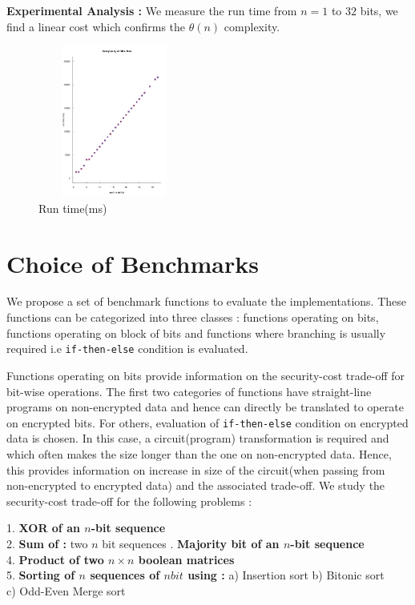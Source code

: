 \documentclass{acm_proc_article-sp}
\begin{document}
\textbf{Experimental Analysis :} We measure the run time from $n=1$ to $32$ bits, we find a linear cost which confirms the $\theta(n)$ complexity.

\begin{figure}[!h] %
\centering
\includegraphics[width=5cm,height=5cm]{f2.pdf} 
\caption{Run time(ms)} 
\label{image_f2} %
\end{figure}

\section{Choice of Benchmarks}
\label{sec:bm}

We propose a set of benchmark functions to evaluate the implementations. These functions can be categorized into three classes : functions operating on bits, functions operating on block of bits and functions where branching is usually required i.e \texttt{if-then-else} condition is evaluated.

Functions operating on bits provide information on the security-cost trade-off for bit-wise operations. The first two categories of functions have straight-line programs on non-encrypted data and hence can directly be translated to operate on encrypted bits. For others, evaluation of \texttt{if-then-else} condition on encrypted data is chosen. In this case, a circuit(program) transformation is required and which often makes the size longer than the one on non-encrypted data. Hence, this provides information on increase in size of the circuit(when passing from non-encrypted to encrypted data) and the associated trade-off. We study the security-cost trade-off for the following problems : 

1. \textbf{XOR of an $n$-bit sequence}\\
2. \textbf{Sum of :}  two $n$ bit sequences  . \textbf{Majority bit of an $n$-bit sequence} \\
4. \textbf{Product of two $n\times n$ boolean matrices} \\
5. \textbf{Sorting of $n$ sequences of $nbit$ using :} \newline\noindent
\phantom{x}\hspace{3ex} a) Insertion sort \phantom{x}\hspace{2ex} b) Bitonic sort \\
	\phantom{x}\hspace{3ex} 	     c) Odd-Even Merge sort 
\end{document}
